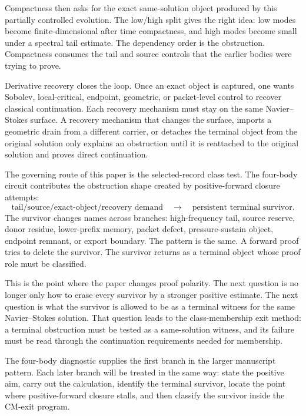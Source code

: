 Compactness then asks for the exact same-solution object produced by this
partially controlled evolution. The low/high split gives the right idea: low
modes become finite-dimensional after time compactness, and high modes become
small under a spectral tail estimate. The dependency order is the obstruction.
Compactness consumes the tail and source controls that the earlier bodies were
trying to prove.

Derivative recovery closes the loop. Once an exact object is captured, one wants
Sobolev, local-critical, endpoint, geometric, or packet-level control to recover
classical continuation. Each recovery mechanism must stay on the same
Navier--Stokes surface. A recovery mechanism that changes the surface, imports a
geometric drain from a different carrier, or detaches the terminal object from
the original solution only explains an obstruction until it is reattached to the
original solution and proves direct continuation.

The governing route of this paper is the selected-record class test.  The
four-body circuit contributes the obstruction shape created by positive-forward
closure attempts:
\[
  \text{tail/source/exact-object/recovery demand}
  \quad\longrightarrow\quad
  \text{persistent terminal survivor}.
\]
The survivor changes names across branches: high-frequency tail, source reserve,
donor residue, lower-prefix memory, packet defect, pressure-sustain object,
endpoint remnant, or export boundary. The pattern is the same. A forward proof
tries to delete the survivor. The survivor returns as a terminal object whose
proof role must be classified.

This is the point where the paper changes proof polarity. The next question is
no longer only how to erase every survivor by a stronger positive estimate. The
next question is what the survivor is allowed to be as a terminal witness for the
same Navier--Stokes solution. That question leads to the class-membership exit
method: a terminal obstruction must be tested as a same-solution witness, and its
failure must be read through the continuation requirements needed for membership.

The four-body diagnostic supplies the first branch in the larger
manuscript pattern. Each later branch will be treated in the same way: state the
positive aim, carry out the calculation, identify the terminal survivor, locate
the point where positive-forward closure stalls, and then classify the survivor
inside the CM-exit program.
